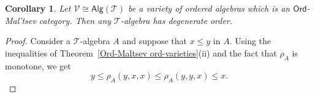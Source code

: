 \documentclass[10pt,a4paper]{amsart}
\newtheorem{corollary}{Corollary}
\newcommand{\Alg}[1]{\ensuremath{\mathsf{Alg}(#1)}}
\newcommand{\Ord}{\ensuremath{\mathsf{Ord}}}
\newcommand{\T}{\ensuremath{\mathcal{T}}}
\newcommand{\V}{\ensuremath{\mathcal{V}}}
\begin{document}
\begin{corollary}\label{Ord-Maltsev vars are degenerate} Let $\V\cong \Alg{\T}$ be a variety of ordered algebras which is an $\Ord$-Mal'tsev category. Then any $\T$-algebra has degenerate order.
\end{corollary}

\begin{proof}
	Consider a $\T$-algebra $A$ and suppose that $x\le y$ in $A$. Using the inequalities of Theorem~\ref{Ord-Maltsev ord-varieties}(ii) and the fact that $\rho_A$ is monotone, we get
\[
	y\le \rho_A(y,x,x)\leq \rho_A(y,y,x)\le x.
\]
\end{proof}
\end{document}
